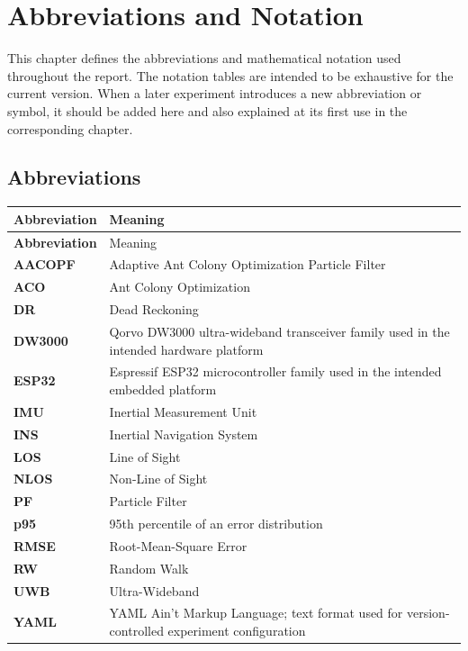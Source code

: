 \chapter*{Abbreviations and Notation}

This chapter defines the abbreviations and mathematical notation used throughout the report. The notation tables are intended to be exhaustive for the current version. When a later experiment introduces a new abbreviation or symbol, it should be added here and also explained at its first use in the corresponding chapter.

\section*{Abbreviations}
\begin{longtable}{>{\bfseries}p{}p{}}
\toprule
Abbreviation & Meaning\\
\midrule
\endfirsthead
\toprule
Abbreviation & Meaning\\
\midrule
\endhead
AACOPF & Adaptive Ant Colony Optimization Particle Filter\\
ACO & Ant Colony Optimization\\
DR & Dead Reckoning\\
DW3000 & Qorvo DW3000 ultra-wideband transceiver family used in the intended hardware platform\\
ESP32 & Espressif ESP32 microcontroller family used in the intended embedded platform\\
IMU & Inertial Measurement Unit\\
INS & Inertial Navigation System\\
LOS & Line of Sight\\
NLOS & Non-Line of Sight\\
PF & Particle Filter\\
p95 & 95th percentile of an error distribution\\
RMSE & Root-Mean-Square Error\\
RW & Random Walk\\
UWB & Ultra-Wideband\\
YAML & YAML Ain't Markup Language; text format used for version-controlled experiment configuration\\
\bottomrule
\end{longtable}

